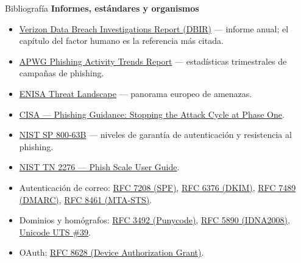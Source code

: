 \documentclass[aspectratio=169,11pt]{beamer}
\newcommand{\lead}[1]{{\color{uznavy}\bfseries #1}\par\smallskip}
\begin{document}
\begin{frame}{Bibliografía}
\small
\lead{Informes, estándares y organismos}
  \begin{itemize}\setlength{\itemsep}{0.35em}
  \item \href{https://www.verizon.com/business/resources/reports/dbir/}{Verizon Data Breach Investigations Report (DBIR)} --- informe anual; el capítulo del factor humano es la referencia más citada.
  \item \href{https://apwg.org/trendsreports/}{APWG Phishing Activity Trends Report} --- estadísticas trimestrales de campañas de phishing.
  \item \href{https://www.enisa.europa.eu/topics/cyber-threats/threats-and-trends}{ENISA Threat Landscape} --- panorama europeo de amenazas.
  \item \href{https://www.cisa.gov/resources-tools/resources/phishing-guidance-stopping-attack-cycle-phase-one}{CISA --- Phishing Guidance: Stopping the Attack Cycle at Phase One}.
  \item \href{https://pages.nist.gov/800-63-3/sp800-63b.html}{NIST SP 800-63B} --- niveles de garantía de autenticación y resistencia al phishing.
  \item \href{https://csrc.nist.gov/pubs/tn/2276/final}{NIST TN 2276 --- Phish Scale User Guide}.
  \item Autenticación de correo: \href{https://www.rfc-editor.org/rfc/rfc7208}{RFC 7208 (SPF)}, \href{https://www.rfc-editor.org/rfc/rfc6376}{RFC 6376 (DKIM)}, \href{https://www.rfc-editor.org/rfc/rfc7489}{RFC 7489 (DMARC)}, \href{https://www.rfc-editor.org/rfc/rfc8461}{RFC 8461 (MTA-STS)}.
  \item Dominios y homógrafos: \href{https://www.rfc-editor.org/rfc/rfc3492}{RFC 3492 (Punycode)}, \href{https://www.rfc-editor.org/rfc/rfc5890}{RFC 5890 (IDNA2008)}, \href{https://www.unicode.org/reports/tr39/}{Unicode UTS \#39}.
  \item OAuth: \href{https://www.rfc-editor.org/rfc/rfc8628}{RFC 8628 (Device Authorization Grant)}.
  \end{itemize}
\end{frame}
\end{document}
